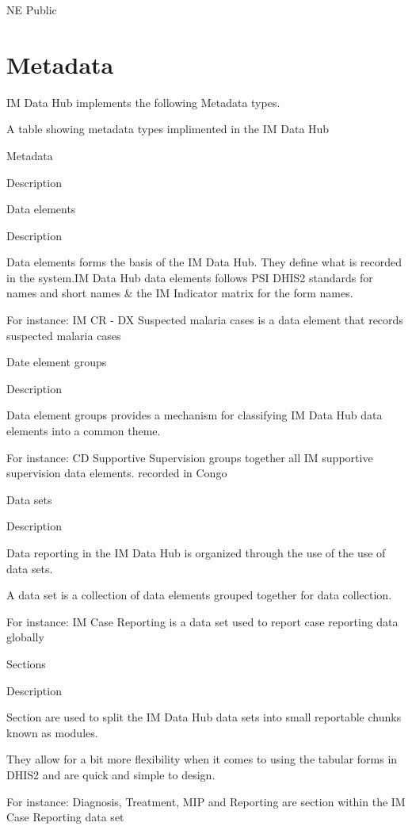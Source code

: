 \documentclass[]{book}
\begin{document}
NE Public

\hypertarget{metadata}{%
\section{Metadata}\label{metadata}}

IM Data Hub implements the following Metadata types.

\label{tab:unnamed-chunk-13}A table showing metadata types implimented in the IM Data Hub

Metadata

Description

Data elements

Description

Data elements forms the basis of the IM Data Hub. They define what is recorded in the system.IM Data Hub data elements follows PSI DHIS2 standards for names and short names \& the IM Indicator matrix for the form names.

For instance: IM CR - DX Suspected malaria cases is a data element that records suspected malaria cases

Date element groups

Description

Data element groups provides a mechanism for classifying IM Data Hub data elements into a common theme.

For instance: CD Supportive Supervision groups together all IM supportive supervision data elements. recorded in Congo

Data sets

Description

Data reporting in the IM Data Hub is organized through the use of the use of data sets.

A data set is a collection of data elements grouped together for data collection.

For instance: IM Case Reporting is a data set used to report case reporting data globally

Sections

Description

Section are used to split the IM Data Hub data sets into small reportable chunks known as modules.

They allow for a bit more flexibility when it comes to using the tabular forms in DHIS2 and are quick and simple to design.

For instance: Diagnosis, Treatment, MIP and Reporting are section within the IM Case Reporting data set
\end{document}
